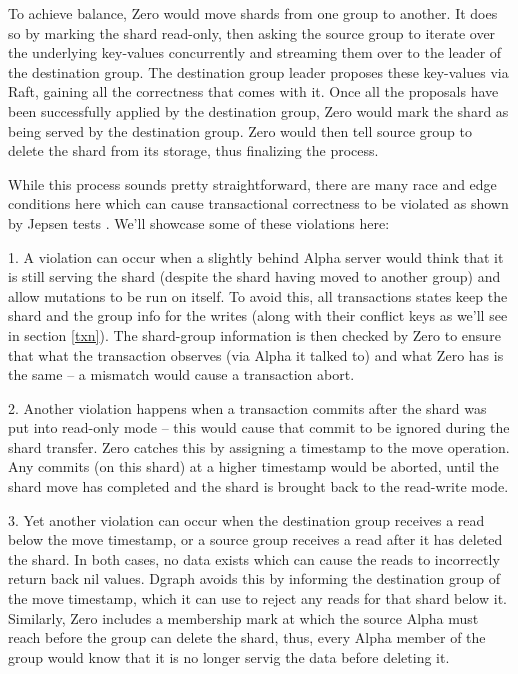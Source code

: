 \documentclass[letterpaper,twocolumn,10pt]{article}
\begin{document}
To achieve balance, Zero would move shards from one group to another. It does so
by marking the shard read-only, then asking the source group to iterate over the
underlying key-values concurrently and streaming them over to the leader of the
destination group. The destination group leader proposes these key-values via
Raft, gaining all the correctness that comes with it. Once all the proposals
have been successfully applied by the destination group, Zero would mark the
shard as being served by the destination group. Zero would then tell source
group to delete the shard from its storage, thus finalizing the process.

While this process sounds pretty straightforward, there are many race and edge
conditions here which can cause transactional correctness to be violated as
shown by Jepsen tests \cite{jepsen}. We'll showcase some of these violations
here:

1. A violation can occur when a slightly behind Alpha server would think that it
is still serving the shard (despite the shard having moved to another group) and
allow mutations to be run on itself. To avoid this, all transactions states keep
the shard and the group info for the writes (along with their conflict keys as
we'll see in section \ref{txn}). The shard-group information is then checked by
Zero to ensure that what the transaction observes (via Alpha it talked to) and
what Zero has is the same -- a mismatch would cause a transaction abort.

2. Another violation happens when a transaction commits after the shard was put
into read-only mode -- this would cause that commit to be ignored during the
shard transfer. Zero catches this by assigning a timestamp to the move
operation. Any commits (on this shard) at a higher timestamp would be aborted,
until the shard move has completed and the shard is brought back to the
read-write mode.

3. Yet another violation can occur when the destination group receives a read
below the move timestamp, or a source group receives a read after it has deleted
the shard. In both cases, no data exists which can cause the reads to
incorrectly return back nil values. Dgraph avoids this by informing the
destination group of the move timestamp, which it can use to reject any reads
for that shard below it. Similarly, Zero includes a membership mark at which
the source Alpha must reach before the group can delete the shard, thus, every
Alpha member of the group would know that it is no longer servig the data before
deleting it.
\end{document}
